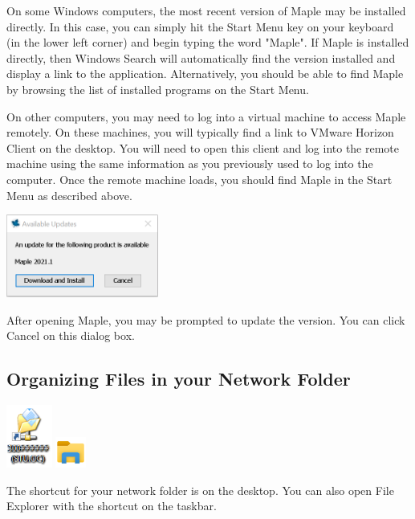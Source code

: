 On some Windows computers, the most recent version of Maple may be installed directly. In this case, you can simply hit the Start Menu key on your keyboard (in the lower left corner) and begin typing the word "Maple". If Maple is installed directly, then Windows Search will automatically find the version installed and display a link to the application. Alternatively, you should be able to find Maple by browsing the list of installed programs on the Start Menu.

On other computers, you may need to log into a virtual machine to access Maple remotely. On these machines, you will typically find a link to VMware Horizon Client on the desktop. You will need to open this client and log into the remote machine using the same information as you previously used to log into the computer. Once the remote machine loads, you should find Maple in the Start Menu as described above.

\begin{marginfigure}[-5cm]
\centering
\includegraphics[width=5cm]{introduction/figures/mapleupdate.png}
\caption{After opening Maple, you may be prompted to update the version. You can click Cancel on this dialog box.}
\end{marginfigure}

\subsection*{Organizing Files in your Network Folder}

\begin{marginfigure}
\centering
\includegraphics[width=1.5cm]{introduction/figures/networkfoldershortcut.png}
\includegraphics[width=1cm]{introduction/figures/fileexplorer.png}
\caption{The shortcut for your network folder is on the desktop. You can also open File Explorer with the shortcut on the taskbar.}
\end{marginfigure}

